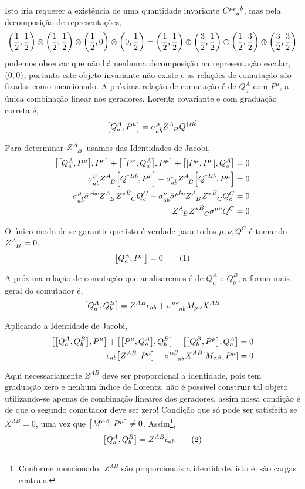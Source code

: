 Isto iria requerer a existência de uma quantidade invariante $\tensor{C}{^\mu^\nu_a^{\dot b}}$, mas pela decomposição de representações,
\[\qty(\frac12,\frac12)\otimes\qty(\frac12,\frac12)\otimes\qty(\frac12,0)\otimes\qty(0,\frac12)=\qty(\frac12,\frac12)\oplus\qty(\frac32,\frac12)\oplus\qty(\frac12,\frac32)\oplus\qty(\frac32,\frac32)\]
podemos observar que não há nenhuma decomposição na representação escalar, $\qty(0,0)$, portanto este objeto invariante não existe e as relações de comutação são 
fixadas como mencionado. A próxima relação de comutação é de $Q_a^A$ com $P^\mu$, a única combinação linear nos geradores, Lorentz 
covariante e com graduação correta é, \[\comm{Q_a^A}{P^\mu}=\sigma^\mu_{a\dot b}\tensor{Z}{^A_B}Q^{\dagger B\dot b}\] 

Para determinar $\tensor{Z}{^A_B}$ usamos das Identidades de Jacobi,
\begin{align*}
    \comm{\comm{Q_a^A}{P^\mu}}{P^\nu}+\comm{\comm{P^\nu}{Q_a^A}}{P^\mu}+\comm{\comm{P^\mu}{P^\nu}}{Q_a^A}&=0\\
    \sigma^\mu_{a\dot b}\tensor{Z}{^A_B}\comm{Q^{\dagger B\dot b}}{P^\nu}-\sigma^\nu_{a\dot b}\tensor{Z}{^A_B}\comm{Q^{\dagger B\dot b}}{P^\mu}&=0\\
    \sigma^\mu_{a\dot b}{\bar\sigma}^{\nu\dot b c}\tensor{Z}{^A_B}\tensor{{Z^\ast}}{^B_C}Q^C_c-\sigma^\nu_{a\dot b}{\bar\sigma}^{\mu\dot b c}\tensor{Z}{^A_B}\tensor{{Z^\ast}}{^B_C}Q^C_c&=0\\
    \tensor{Z}{^A_B}\tensor{{Z^\ast}}{^B_C}\sigma^{\mu\nu}Q^C&=0
\end{align*}

O único modo de se garantir que isto é verdade para todos $\mu,\nu, Q^C$ é tomando $\tensor{Z}{^A_B}=0$,\[\comm{Q_a^A}{P^\mu}=0\numberthis\label{qp}\]

A próxima relação de comutação que analisaremos é de $Q_a^A$ e $Q_b^B$, a forma mais geral do comutador é, 
\[\comm{Q_a^A}{Q_b^B}=Z^{AB}\epsilon_{ab}+\tensor{\sigma}{^\mu^\nu_a_b}M_{\mu\nu}X^{AB}\]

Aplicando a Identidade de Jacobi,
\begin{align*}
    \comm{\comm{Q_a^A}{Q_b^B}}{P^\mu}+\comm{\comm{P^\mu}{Q_a^A}}{Q_b^B}-\comm{\comm{Q_b^B}{P^\mu}}{Q_a^A}&=0\\
    \epsilon_{ab}\comm{Z^{AB}}{P^\mu}+\tensor{\sigma}{^\alpha^\beta_a_b}X^{AB}\comm{M_{\alpha\beta}}{P^\mu}&=0
\end{align*}

Aqui necessariamente $Z^{AB}$ deve ser proporcional a identidade, pois tem graduação zero e nenhum índice de Lorentz, não é possível construir tal objeto utilizando-se apenas 
de combinação lineares dos geradores, assim nossa condição é de que o segundo comutador deve ser zero! Condição que só pode ser satisfeita se $X^{AB}=0$, uma vez que $\comm{M^{\alpha\beta}}{P^\mu}\neq 0$. 
Assim\footnote{Conforme mencionado, $Z^{AB}$ são proporcionais a identidade, isto é, são cargas centrais.}, \[\comm{Q_a^A}{Q_b^B}=Z^{AB}\epsilon_{ab}\numberthis\label{qq}\]

